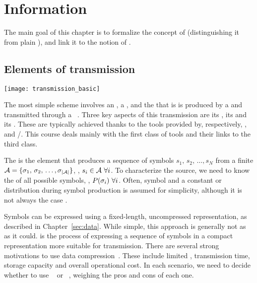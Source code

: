 \chapter{Information}\label{sec:info}

The main goal of this chapter is to formalize the concept of 
(distinguishing it from plain ), and link it to the notion of .

\section{Elements of transmission}\label{sec:info:elements}

\begin{center}
    \texttt{[image: transmission\_basic]}
\end{center}

The most simple  scheme involves an , a , and the  that is
is produced by a  and transmitted through a ~\cite{shannon_communication,stone_information}.
Three key aspects of this transmission are its , its  and its .
These are typically achieved thanks to the tools provided by, respectively,
,  and /.
This course deals mainly with the first class of tools and their links to the third class.

The  \source
is the element that produces a sequence of symbols $s_1,\,s_2,\,\ldots,s_N$
from a finite 
$\mathcal{A} = \{\sigma_1,\,\sigma_2,\,\ldots,\sigma_{|\mathcal{A}|}\}$, \ie, $s_i \in \mathcal{A}\ \forall i$.
To characterize the source, we need to know the  of all possible symbols,
\eg, $P(\sigma_i)\ \forall i$.
Often, symbol  and a constant or ~\cite[\S 4.1]{sayood_introduction}
distribution during symbol production is assumed for simplicity, although it is not always the case
\cite[\S 2.2]{sayood_introduction}.

Symbols can be expressed using a fixed-length, uncompressed representation, as described in Chapter~\ref{sec:data}.
While simple, this approach is generally not as  as it could.
 is the process of expressing a sequence of symbols
in a compact representation more suitable for transmission.
%
There are several strong motivations to use data compression~\cite[\S 1]{sayood_introduction}.
These include limited , transmission time, storage capacity and overall operational cost.
In each scenario, we need to decide whether to use ~\cite[\S 1.1.1]{sayood_introduction}
or ~\cite[\S 1.1.2]{sayood_introduction}, weighing the pros and cons of each one.


